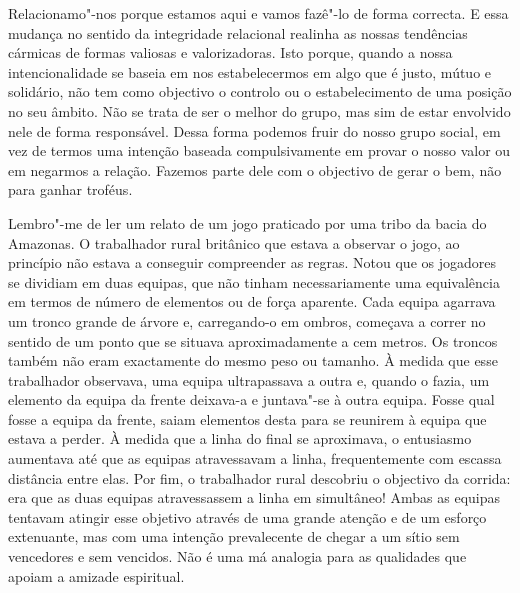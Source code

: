 Relacionamo"-nos porque estamos aqui e vamos
fazê"-lo de forma correcta. E essa mudança no sentido da integridade relacional
realinha as nossas tendências cármicas de formas valiosas e valorizadoras. Isto
porque, quando a nossa intencionalidade se baseia em nos estabelecermos em algo
que é justo, mútuo e solidário, não tem como objectivo o controlo ou o
estabelecimento de uma posição no seu âmbito. Não se trata de ser o melhor do
grupo, mas sim de estar envolvido nele de forma responsável. Dessa forma podemos
fruir do nosso grupo social, em vez de termos uma intenção baseada
compulsivamente em provar o nosso valor ou em negarmos a relação. Fazemos parte
dele com o objectivo de gerar o bem, não para ganhar troféus.

Lembro"-me de ler um relato de um jogo praticado por uma tribo da bacia do
Amazonas. O trabalhador rural britânico que estava a observar o jogo, ao
princípio não estava a conseguir compreender as regras. Notou que os jogadores
se dividiam em duas equipas, que não tinham necessariamente uma equivalência em
termos de número de elementos ou de força aparente. Cada equipa agarrava um
tronco grande de árvore e, carregando-o em ombros, começava a correr no sentido
de um ponto que se situava aproximadamente a cem metros. Os troncos também não
eram exactamente do mesmo peso ou tamanho. À medida que esse trabalhador
observava, uma equipa ultrapassava a outra e, quando o fazia, um elemento da
equipa da frente deixava-a e juntava"-se à outra equipa. Fosse qual fosse a
equipa da frente, saiam elementos desta para se reunirem à equipa que estava a
perder. À medida que a linha do final se aproximava, o entusiasmo aumentava até
que as equipas atravessavam a linha, frequentemente com escassa distância entre
elas. Por fim, o trabalhador rural descobriu o objectivo da corrida: era que as
duas equipas atravessassem a linha em simultâneo! Ambas as equipas tentavam
atingir esse objetivo através de uma grande atenção e de um esforço extenuante,
mas com uma intenção prevalecente de chegar a um sítio sem vencedores e sem
vencidos. Não é uma má analogia para as qualidades que apoiam a amizade
espiritual.

